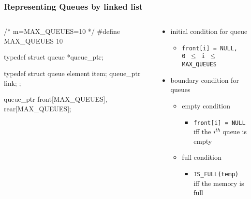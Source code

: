 \documentclass[newPxFont,sthlmFooter,nooffset]{beamer}
\begin{document}
\begin{frame}[t, fragile]
  \frametitle{Representing Queues by linked list}
  \begin{columns}
    \begin{column}{0.5\textwidth}
  \begin{ncodedef}
/* m=MAX_QUEUES=10 */ 
#define MAX_QUEUES 10 

typedef struct queue *queue_ptr;

typedef struct queue {
    element item;
    queue_ptr link; 
};

queue_ptr front[MAX_QUEUES], 
          rear[MAX_QUEUES];    
  \end{ncodedef}      
    \end{column}
    \begin{column}{0.5\textwidth}
      \begin{itemize}
      \item initial condition for queue
        \begin{itemize}
        \item \texttt{front[i] = NULL, \\0 $\leq$ i $\leq$ MAX\_QUEUES}
        \end{itemize}
      \item boundary condition for queues
        \begin{itemize}
        \item empty condition
          \begin{itemize}
          \item \texttt{front[i] = NULL} \\iff the $i^{th}$ queue is empty
          \end{itemize}

        \item full condition
          \begin{itemize}
          \item \texttt{IS\_FULL(temp)} \\iff the memory is full
          \end{itemize}

        \end{itemize}


      \end{itemize}
    \end{column}
  \end{columns}

\end{frame}
\end{document}
